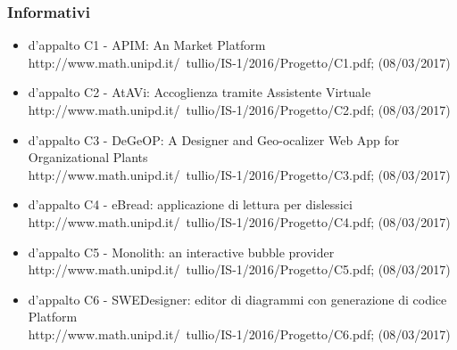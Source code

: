 \documentclass[../NormeDiProgetto.tex]{subfiles}
\begin{document}
			\subsubsection{Informativi}
			\begin{itemize}
				\item {} d'appalto C1 - APIM: An  Market Platform \\
				http://www.math.unipd.it/~tullio/IS-1/2016/Progetto/C1.pdf; (08/03/2017)
				\item {} d'appalto C2 - AtAVi: Accoglienza tramite Assistente Virtuale \\
				http://www.math.unipd.it/~tullio/IS-1/2016/Progetto/C2.pdf; (08/03/2017)
				\item {} d'appalto C3 - DeGeOP: A Designer and Geo-ocalizer Web App for Organizational Plants \\
				http://www.math.unipd.it/~tullio/IS-1/2016/Progetto/C3.pdf; (08/03/2017)
				\item {} d'appalto C4 - eBread: applicazione di lettura per dislessici \\
				http://www.math.unipd.it/~tullio/IS-1/2016/Progetto/C4.pdf; (08/03/2017)
				\item {} d'appalto C5 - Monolith: an interactive bubble provider \\
				http://www.math.unipd.it/~tullio/IS-1/2016/Progetto/C5.pdf; (08/03/2017)
				\item {} d'appalto C6 - SWEDesigner: editor di diagrammi  con generazione di codice Platform \\
				http://www.math.unipd.it/~tullio/IS-1/2016/Progetto/C6.pdf; (08/03/2017)
			\end{itemize}
\end{document}
